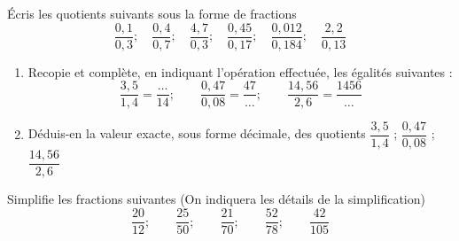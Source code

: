 \begin{myenumerate}
\item \'Ecris les quotients suivants sous la forme de fractions
\[\frac{0,1}{0,3};\quad\frac{0,4}{0,7};\quad\frac{4,7}{0,3};
\quad\frac{0,45}{0,17};\quad\frac{0,012}{0,184};\quad\frac{2,2}{0,13}\]
\item
\begin{enumerate}
\item Recopie et complète, en indiquant l'opération effectuée, les
égalités suivantes :
\[\frac{3,5}{1,4}=\frac{\dots}{14};\qquad\frac{0,47}{0,08}=
\frac{47}{\dots};\qquad\frac{14,56}{2,6}=\frac{1456}{\dots}\]
\item Déduis-en la valeur exacte, sous forme décimale, des quotients
 $\dfrac{3,5}{1,4}$ ; $\dfrac{0,47}{0,08}$ ; $\dfrac{14,56}{2,6}$
\end{enumerate}
\item Simplifie les fractions suivantes (On indiquera les détails
 de la simplification)
\[\frac{20}{12};\qquad\frac{25}{50};\qquad\frac{21}{70};\qquad
\frac{52}{78};\qquad\frac{42}{105}\]
\end{myenumerate}